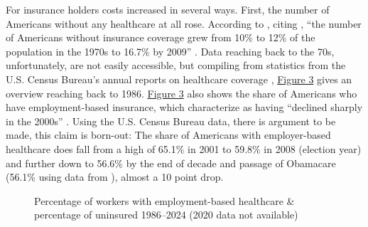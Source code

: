 \documentclass[11pt]{article}
\begin{document}
For insurance holders costs increased in several ways. First, the number of Americans without any healthcare at all rose. According to \textcite[][]{Jacobs2014}, citing \textcite[][]{Starr2011}, \enquote{the number of Americans without insurance coverage grew from 10\% to 12\% of the population in the 1970s to 16.7\% by 2009} \parencite[p. 451-452]{Jacobs2014}. Data reaching back to the 70s, unfortunately, are not easily accessible, but compiling from statistics from the U.S. Census Bureau's annual reports on healthcare coverage \parencites{Census2013}[see the supplemental matieral of][note that the methdology of these studies has been slightly adjusted over-time somewhat limiting comparability between the two study periods]{Census2024}, \hyperref[fig:emp_un]{Figure 3} gives an overview reaching back to 1986. \hyperref[fig:emp_un]{Figure 3} also shows the share of Americans who have employment-based insurance, which \textcite[][]{Jacobs2014} characterize as having \enquote{declined sharply in the 2000s} . Using the U.S. Census Bureau data, there is argument to be made, this claim is born-out: The share of Americans with employer-based healthcare does fall from a high of 65.1\% in 2001 to 59.8\% in 2008 (election year) and further down to 56.6\% by the end of decade and passage of Obamacare (56.1\% using data from ), almost a 10 point drop.

\begin{figure}[H]
  \sffamily
  \caption{Percentage of workers with employment-based healthcare \& percentage of uninsured 1986--2024 (2020 data not available)}
  
  \label{fig:emp_un}
\end{figure}
\end{document}

